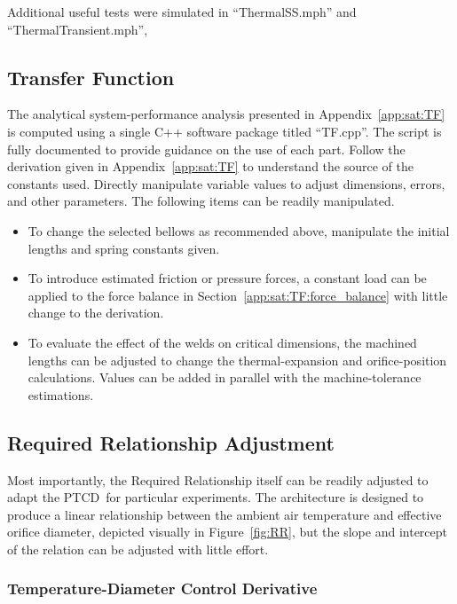 \documentclass[12pt, letterpaper]{report}%
\newcounter{mycounter}           %
\newcounter{sub}[mycounter]      %
\newcommand{\device}{PTCD}
\begin{document}
\begin{appendices}
			Additional useful tests were simulated in ``ThermalSS.mph'' and ``ThermalTransient.mph'',

		\subsection{Transfer Function}
		\label{app:iter:customize:TF}

			The analytical system-performance analysis presented in Appendix~\ref{app:sat:TF} is computed using a single C++ software package titled ``TF.cpp''. The script is fully documented to provide guidance
			on the use of each part. Follow the derivation given in Appendix~\ref{app:sat:TF} to understand the source of the constants used.
			Directly manipulate variable values to adjust dimensions, errors, and other parameters. The following items can be readily manipulated.
			
			\begin{itemize}
				\item To change the selected bellows as recommended above, manipulate the initial lengths and spring constants given.
				\item To introduce estimated friction or pressure forces, a constant load can be applied to the force balance in Section~\ref{app:sat:TF:force_balance} with little change to the derivation.
				\item To evaluate the effect of the welds on critical dimensions, the machined lengths can be adjusted to change the thermal-expansion and orifice-position calculations.
					Values can be added in parallel with the machine-tolerance estimations.
			\end{itemize}

		\subsection{Required Relationship Adjustment}
		\label{app:iter:customize:RR}

			Most importantly, the Required Relationship itself can be readily adjusted to adapt the \device\ for particular experiments.
			The architecture is designed to produce a linear relationship between the ambient air temperature and effective orifice diameter,
			depicted visually in Figure~\ref{fig:RR},
			but the slope and intercept of the relation can be adjusted with little effort.

			\subsubsection{Temperature-Diameter Control Derivative}
			\label{app:iter:customize:RR:slope}


\end{appendices}
\end{document}

